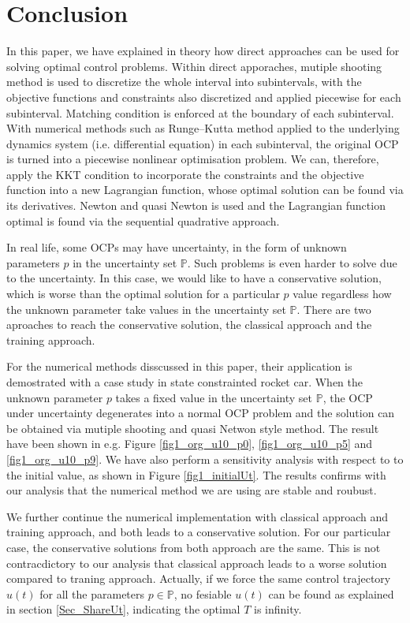 \documentclass  [
  paper    = a4,
  BCOR     = 10mm,
  twoside,
  fontsize = 12pt,
  fleqn,
  toc      = bibnumbered,
  toc      = listofnumbered,
  numbers  = noendperiod,
  headings = normal,
  listof   = leveldown,
  version  = 3.03
]                                       {scrreprt}
\newcommand{\<}{\langle}
\renewcommand{\>}{\rangle}
\begin{document}
\chapter{Conclusion}
\label{Chapter5}
In this paper, we have explained in theory how direct approaches can be used for solving optimal control problems. Within direct apporaches, mutiple shooting method is used to discretize the whole interval into subintervals, with the objective functions and constraints also discretized and applied piecewise for each subinterval. Matching condition is enforced at the boundary of each subinterval. With numerical methods such as Runge–Kutta method applied to the underlying dynamics system (i.e. differential equation) in each subinterval, the original OCP is turned into a piecewise nonlinear optimisation problem. We can, therefore, apply the KKT condition to incorporate the constraints and the objective function into a new Lagrangian function, whose optimal solution can be found via its derivatives. Newton and quasi Newton is used and the Lagrangian function optimal is found via the sequential quadrative approach. 

In real life, some OCPs may have uncertainty, in the form of unknown parameters $p$ in the uncertainty set  $\mathbb{P}$. Such problems is even harder to solve due to the uncertainty. In this case, we would like to have a conservative solution, which is worse than the optimal solution for a particular $p$ value regardless how the unknown parameter take values in the uncertainty set $\mathbb{P}$. There are two aproaches to reach the conservative solution, the classical approach and the training approach. 

For the numerical methods disscussed in this paper, their application is demostrated with a case study in state constrainted rocket car. When the unknown parameter $p$ takes a fixed value in the uncertainty set  $\mathbb{P}$, the OCP under uncertainty degenerates into a normal OCP problem and the solution can be obtained via mutiple shooting and quasi Netwon style method. The result have been shown in e.g.  Figure  \ref{fig1_org_u10_p0},  \ref{fig1_org_u10_p5} and \ref{fig1_org_u10_p9}. We have also perform a sensitivity analysis with respect to to the initial value, as shown in Figure \ref{fig1_initialUt}. The results confirms with our analysis that the numerical method we are using are stable and roubust.


We further continue the numerical implementation with classical approach and training approach, and both leads to a conservative solution. For our particular case, the conservative solutions from both approach are  the same. This is not contracdictory to our analysis that classical approach leads to a worse solution compared to traning approach. Actually, if we force the same control trajectory $u(t)$ for all the parameters $p \in \mathbb{P}$, no fesiable $u(t)$ can be found as explained in section \ref{Sec_ShareUt}, indicating the optimal $T$ is infinity. 
\end{document}
